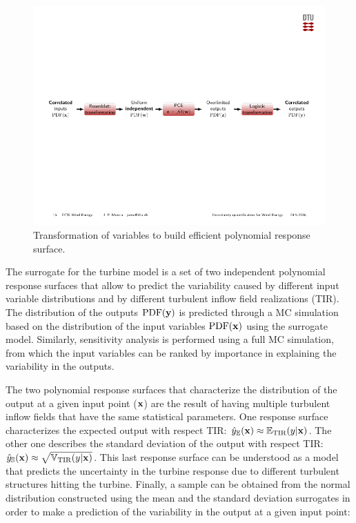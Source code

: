 \documentclass[preprint,12pt]{elsarticle}
\begin{document}

\begin{figure}[h!]
\begin{centering}
\includegraphics[width=\columnwidth]{Figures/2_transfromation_steps.pdf}
\caption{Transformation of variables to build efficient polynomial response surface.}
\label{fig_2_trans}
\end{centering}
\end{figure}

The surrogate for the turbine model is a set of two independent polynomial response surfaces that allow to predict the variability caused by different input variable distributions and by different turbulent inflow field realizations (TIR). The distribution of the outputs $\mathrm{PDF}(\mathbf{y})$ is predicted through a MC simulation based on the distribution of the input variables $\mathrm{PDF}(\mathbf{x})$ using the surrogate model. Similarly, sensitivity analysis is performed using a full MC simulation, from which the input variables can be ranked by importance in explaining the variability in the outputs. 

The two polynomial response surfaces that characterize the distribution of the output at a given input point ($\mathbf{x}$) are the result of having multiple turbulent inflow fields that have the same statistical parameters. One response surface characterizes the expected output with respect TIR: $\hat{y}_{\mathbb{E}}(\mathbf{x})\approx \mathbb{E}_{\text{TIR}}(y|\mathbf{x})$. The other one describes the standard deviation of the output with respect TIR: $\hat{y}_{\mathbb{S}}(\mathbf{x}) \approx \sqrt{\mathbb{V}_{\text{TIR}}(y|\mathbf{x})}$. This last response surface can be understood as a model that predicts the uncertainty in the turbine response due to different turbulent structures hitting the turbine. Finally, a sample can be obtained from the normal distribution constructed using the mean and the standard deviation surrogates in order to make a prediction of the variability in the output at a given input point:
\end{document}
